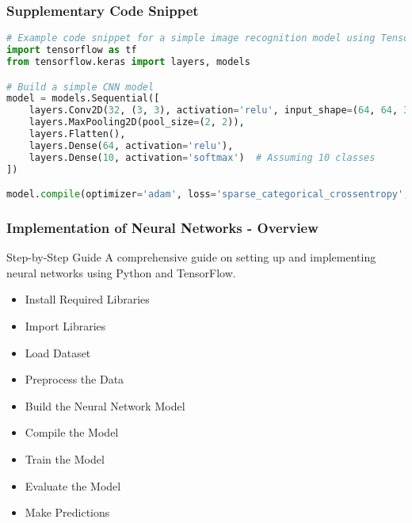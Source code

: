 \documentclass[aspectratio=169]{beamer}
\begin{document}
\begin{frame}[fragile]
  \frametitle{Supplementary Code Snippet}
  \begin{lstlisting}[language=Python]
# Example code snippet for a simple image recognition model using TensorFlow
import tensorflow as tf
from tensorflow.keras import layers, models

# Build a simple CNN model
model = models.Sequential([
    layers.Conv2D(32, (3, 3), activation='relu', input_shape=(64, 64, 3)),
    layers.MaxPooling2D(pool_size=(2, 2)),
    layers.Flatten(),
    layers.Dense(64, activation='relu'),
    layers.Dense(10, activation='softmax')  # Assuming 10 classes
])

model.compile(optimizer='adam', loss='sparse_categorical_crossentropy', metrics=['accuracy'])
  \end{lstlisting}
\end{frame}

\begin{frame}[fragile]
    \frametitle{Implementation of Neural Networks - Overview}
    \begin{block}{Step-by-Step Guide}
        A comprehensive guide on setting up and implementing neural networks using Python and TensorFlow.
    \end{block}
    \begin{itemize}
        \item Install Required Libraries
        \item Import Libraries
        \item Load Dataset
        \item Preprocess the Data
        \item Build the Neural Network Model
        \item Compile the Model
        \item Train the Model
        \item Evaluate the Model
        \item Make Predictions
    \end{itemize}
\end{frame}
\end{document}
